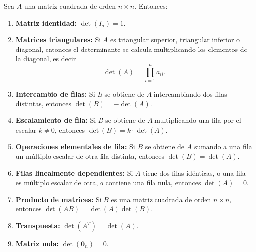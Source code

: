 \begin{theorem}\label{thm:det-prop}
Sea $A$ una matriz cuadrada de orden $n \times n$. Entonces:

\begin{enumerate}
    \item \textbf{Matriz identidad:} $\det(I_n) = 1$.
    
    \item \textbf{Matrices triangulares:} Si $A$ es triangular superior, triangular inferior o diagonal, entonces el determinante se calcula multiplicando los elementos de la diagonal, es decir
    \[
    \det(A) = \prod_{i=1}^n a_{ii}.
    \]
    
    \item \textbf{Intercambio de filas:} Si $B$ se obtiene de $A$ intercambiando dos filas distintas, entonces $\det(B) = -\det(A)$.
    
    \item \textbf{Escalamiento de fila:} Si $B$ se obtiene de $A$ multiplicando una fila por el escalar $k \neq 0$, entonces $\det(B) = k \cdot \det(A)$.
    
    \item \textbf{Operaciones elementales de fila:} Si $B$ se obtiene de $A$ sumando a una fila un múltiplo escalar de otra fila distinta, entonces $\det(B) = \det(A)$.
    
    \item \textbf{Filas linealmente dependientes:} Si $A$ tiene dos filas idénticas, o una fila es múltiplo escalar de otra, o contiene una fila nula, entonces $\det(A) = 0$.
    
    \item \textbf{Producto de matrices:} Si $B$ es una matriz cuadrada de orden $n \times n$, entonces $\det(AB) = \det(A)\det(B)$.
    
    \item \textbf{Transpuesta:} $\det(A^T) = \det(A)$.
    
    \item \textbf{Matriz nula:} $\det(\mathbf{0}_n) = 0$.
\end{enumerate}
\end{theorem}

